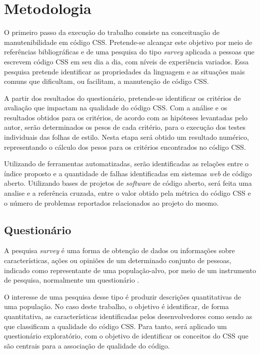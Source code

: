 %
%

\chapter{Metodologia}

O primeiro passo da execução do trabalho consiste na conceituação de manutenibilidade em código CSS. Pretende-se alcançar este objetivo por meio de referências bibliográficas e de uma pesquisa do tipo \textit{survey} aplicada a pessoas que escrevem código CSS em seu dia a dia, com níveis de experiência variados. Essa pesquisa pretende identificar as propriedades da linguagem e as situações mais comuns que dificultam, ou facilitam, a manutenção de código CSS.

A partir dos resultados do questionário, pretende-se identificar os critérios de avaliação que impactam na qualidade do código CSS. Com a análise e os resultados obtidos para os critérios, de acordo com as hipóteses levantadas pelo autor, serão determinados os pesos de cada critério, para o execução dos testes individuais das folhas de estilo. Nesta etapa será obtido um resultado numérico, representando o cálculo dos pesos para os critérios encontrados no código CSS.

Utilizando de ferramentas automatizadas, serão identificadas as relações entre o índice proposto e a quantidade de falhas identificadas em sistemas \textit{web} de código aberto. Utilizando bases de projetos de \textit{software} de código aberto, será feita uma analise e a referência cruzada, entre o valor obtido pela métrica do código CSS e o número de problemas reportados relacionados ao projeto do mesmo.

\section{Questionário}

A pesquisa \textit{survey} é uma forma de obtenção de dados ou informações sobre características, ações ou opiniões de um determinado conjunto de pessoas, indicado como representante de uma população-alvo, por meio de um instrumento de pesquisa, normalmente um questionário \cite{Freitas2000}. 

O interesse de uma pesquisa desse tipo é produzir descrições quantitativas de uma população. No caso deste trabalho, o objetivo é identificar, de forma quantitativa, as características identificadas pelos desenvolvedores como sendo as que classificam a qualidade do código CSS. Para tanto, será aplicado um questionário exploratório, com o objetivo de identificar os conceitos do CSS que são centrais para a associação de qualidade do código.

